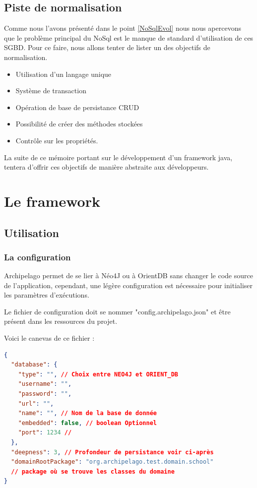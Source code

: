 \documentclass[a4paper,fleqn,12pt]{report}
\begin{document}
\section{Piste de normalisation}

Comme nous l'avons présenté dans le point \ref{NoSqlEvol} nous nous apercevons que le problème principal du NoSql est le manque de standard d'utilisation de ces SGBD. Pour ce faire, nous allons tenter de lister un des objectifs de normalisation.

\begin{itemize}
\item Utilisation d'un langage unique
\item Système de transaction 
\item Opération de base de persistance CRUD
\item Possibilité de créer des méthodes stockées
\item Contrôle sur les propriétés.
\end{itemize}

La suite de ce mémoire portant sur le développement d'un framework java, tentera d'offrir ces objectifs de manière abstraite aux développeurs.

\chapter{Le framework}
\section{Utilisation}

\subsection{La configuration}

Archipelago permet de se lier à Néo4J ou à OrientDB sans changer le code source de l'application, cependant, une légère configuration est nécessaire pour initialiser les paramètres d'exécutions.

Le fichier de configuration doit se nommer "config.archipelago.json" et être présent dans les ressources du projet.

Voici le canevas de ce fichier :

\begin{lstlisting}[language=json]
{
  "database": {
    "type": "", // Choix entre NEO4J et ORIENT_DB
    "username": "",
    "password": "",
    "url": "",
    "name": "", // Nom de la base de donnée
    "embedded": false, // boolean Optionnel
    "port": 1234 // 
  },
  "deepness": 3, // Profondeur de persistance voir ci-après
  "domainRootPackage": "org.archipelago.test.domain.school" 
  // package où se trouve les classes du domaine 
}
\end{lstlisting}
\end{document}
